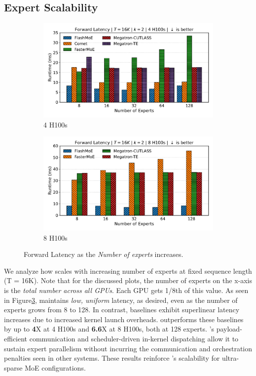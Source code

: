 \subsection{Expert Scalability}\label{subsec:expert-scalability}
\begin{figure}[!h]
    \centering
    \begin{subfigure}{0.49\textwidth}
        \centering
        \includegraphics[width=\linewidth, keepaspectratio]{flash_figs/scaling_experts}
        \caption{4 H100s}
        \label{sub:4gx}
    \end{subfigure}
    \begin{subfigure}{0.49\textwidth}
        \centering
        \includegraphics[width=\linewidth, keepaspectratio]{flash_figs/scaling_experts_8}
        \caption{8 H100s}
        \label{sub:8gx}
    \end{subfigure}
    \caption{Forward Latency as the \emph{Number of experts} increases.}
    \label{fig:xs}
\end{figure}
We analyze how \sysname scales with increasing number of experts at fixed sequence length (T = 16K).
Note that for the discussed plots, the number of experts on the x-axis is the \emph{total number across all GPUs}.
Each GPU gets 1/8th of this value.
As seen in Figure\ref{fig:xs}, \sysname maintains \emph{low, uniform} latency, as desired,
even as the number of experts grows from 8 to 128.
In contrast, baselines exhibit superlinear latency increases due to increased kernel launch overheads.
\sysname outperforms these baselines by up to \textbf{4}X at 4 H100s and \textbf{6.6}X at 8 H100s, both at 128 experts.
\sysname’s payload-efficient communication and scheduler-driven
in-kernel dispatching allow it to sustain expert parallelism
without incurring the communication and orchestration penalties seen in other systems.
These results reinforce \sysname’s scalability for ultra-sparse MoE configurations.
